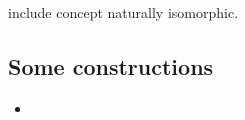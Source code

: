 {\color{red} include concept naturally isomorphic.}

\subsection{Some constructions}
\begin{itemize}
\item
\end{itemize}

